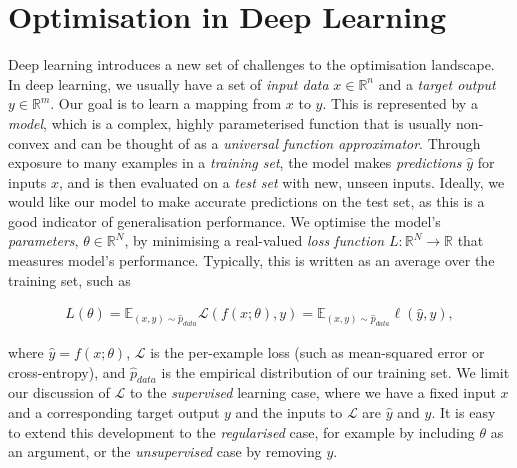 \section{Optimisation in Deep Learning}

\label{sec:optimisation_in_deep_learning}

Deep learning introduces a new set of challenges to the optimisation landscape. In deep learning, we usually have a set of \textit{input data} $x \in \mathbb{R}^n$ and a \textit{target output} $y \in \mathbb{R}^m$. Our goal is to learn a mapping from $x$ to $y$. This is represented by a \textit{model}, which is a complex, highly parameterised function that is usually non-convex and can be thought of as a \textit{universal function approximator}. Through exposure to many examples in a \textit{training set}, the model makes \textit{predictions} $\hat{y}$ for inputs $x$, and is then evaluated on a \textit{test set} with new, unseen inputs. Ideally, we would like our model to make accurate predictions on the test set, as this is a good indicator of generalisation performance. We optimise the model's \textit{parameters}, $\theta \in \mathbb{R}^N$, by minimising a real-valued \textit{loss function} $L: \mathbb{R}^N \to \mathbb{R}$ that measures model's performance. Typically, this is written as an average over the training set, such as

\begin{align}

    L(\theta) = \mathbb{E}_{(x, y) \sim \hat{p}_{data}} \mathcal{L}(f(x; \theta), y) = \mathbb{E}_{(x, y) \sim \hat{p}_{data}} \ell(\hat{y}, y),

\end{align}

where $\hat{y} = f(x; \theta)$, $\mathcal{L}$ is the per-example loss (such as mean-squared error or cross-entropy), and $\hat{p}_{data}$ is the empirical distribution of our training set. We limit our discussion of $\mathcal{L}$ to the \textit{supervised} learning case, where we have a fixed input $x$ and a corresponding target output $y$ and the inputs to $\mathcal{L}$ are $\hat{y}$ and $y$. It is easy to extend this development to the \textit{regularised} case, for example by including $\theta$ as an argument, or the \textit{unsupervised} case by removing $y$. 



